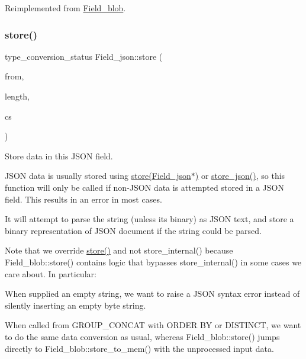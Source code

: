 Reimplemented from \mbox{\hyperlink{classField__blob}{Field\+\_\+blob}}.

\mbox{\label{classField__json_a158c3f1c43417d7f5d4aa8cbd572aaf5}} 
\subsubsection{\texorpdfstring{store()}{store()}\hspace{0.1cm}{\footnotesize\ttfamily [1/2]}}
{\footnotesize\ttfamily type\+\_\+conversion\+\_\+status Field\+\_\+json\+::store (\begin{DoxyParamCaption}\item[{const char $\ast$}]{from,  }\item[{size\+\_\+t}]{length,  }\item[{const C\+H\+A\+R\+S\+E\+T\+\_\+\+I\+N\+FO $\ast$}]{cs }\end{DoxyParamCaption})\hspace{0.3cm}{\ttfamily [virtual]}}

Store data in this J\+S\+ON field.

J\+S\+ON data is usually stored using \mbox{\hyperlink{classField__json_a14e5d7ad204fd25768140bff8fa7aafa}{store(\+Field\+\_\+json$\ast$)}} or \mbox{\hyperlink{classField__json_a7340a06a3ea62eaab391a9187ab68414}{store\+\_\+json()}}, so this function will only be called if non-\/J\+S\+ON data is attempted stored in a J\+S\+ON field. This results in an error in most cases.

It will attempt to parse the string (unless it\textquotesingle{}s binary) as J\+S\+ON text, and store a binary representation of J\+S\+ON document if the string could be parsed.

Note that we override \mbox{\hyperlink{classField__json_a158c3f1c43417d7f5d4aa8cbd572aaf5}{store()}} and not store\+\_\+internal() because Field\+\_\+blob\+::store() contains logic that bypasses store\+\_\+internal() in some cases we care about. In particular\+:


\begin{DoxyItemize}
\item When supplied an empty string, we want to raise a J\+S\+ON syntax error instead of silently inserting an empty byte string.
\item When called from G\+R\+O\+U\+P\+\_\+\+C\+O\+N\+C\+AT with O\+R\+D\+ER BY or D\+I\+S\+T\+I\+N\+CT, we want to do the same data conversion as usual, whereas Field\+\_\+blob\+::store() jumps directly to Field\+\_\+blob\+::store\+\_\+to\+\_\+mem() with the unprocessed input data.
\end{DoxyItemize}


